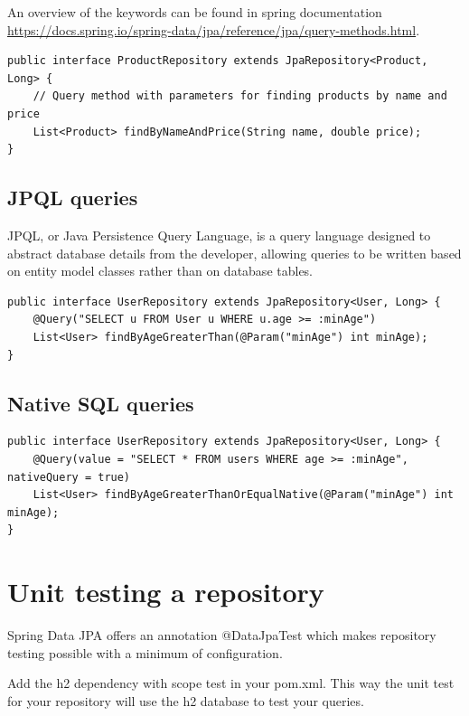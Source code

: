 An overview of the keywords can be found in spring documentation \url{https://docs.spring.io/spring-data/jpa/reference/jpa/query-methods.html}.

\begin{lstlisting}
public interface ProductRepository extends JpaRepository<Product, Long> {
    // Query method with parameters for finding products by name and price
    List<Product> findByNameAndPrice(String name, double price);
}
\end{lstlisting}

\subsection{JPQL queries}

JPQL, or Java Persistence Query Language, is a query language designed to abstract database details from the developer, allowing queries to be written based on entity model classes rather than on database tables.


\begin{lstlisting}
public interface UserRepository extends JpaRepository<User, Long> {
    @Query("SELECT u FROM User u WHERE u.age >= :minAge")
    List<User> findByAgeGreaterThan(@Param("minAge") int minAge);
}
\end{lstlisting}

\subsection{Native SQL queries}

\begin{lstlisting}
public interface UserRepository extends JpaRepository<User, Long> {
    @Query(value = "SELECT * FROM users WHERE age >= :minAge", nativeQuery = true)
    List<User> findByAgeGreaterThanOrEqualNative(@Param("minAge") int minAge);
}
\end{lstlisting}


\section{Unit testing a repository}

Spring Data JPA offers an annotation @DataJpaTest which makes repository testing possible with a minimum of configuration. 

Add the h2 dependency with scope test in your pom.xml. This way the unit test for your repository will use the h2 database to test your queries.

